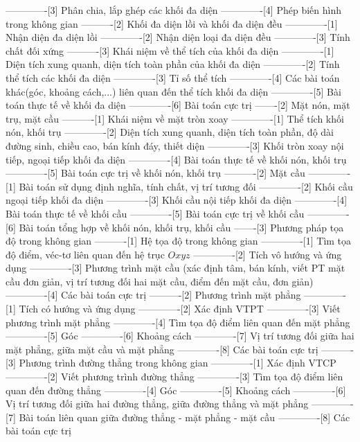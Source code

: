 -------------[3] Phân chia, lắp ghép các khối đa diện
-------------[4] Phép biến hình trong không gian
----------[2] Khối đa diện lồi và khối đa diện đều
-------------[1] Nhận diện đa diện lồi
-------------[2] Nhận diện loại đa diện đều
-------------[3] Tính chất đối xứng
----------[3] Khái niệm về thể tích của khối đa diện
-------------[1] Diện tích xung quanh, diện tích toàn phần của khối đa diện
-------------[2] Tính thể tích các khối đa diện
-------------[3] Tỉ số thể tích
-------------[4] Các bài toán khác(góc, khoảng cách,...) liên quan đến thể tích khối đa diện
-------------[5] Bài toán thực tế về khối đa diện
-------------[6] Bài toán cực trị
-------[2] Mặt nón, mặt trụ, mặt cầu
----------[1] Khái niệm về mặt tròn xoay
-------------[1] Thể tích khối nón, khối trụ
-------------[2] Diện tích xung quanh, diện tích toàn phần, độ dài đường sinh, chiều cao, bán kính đáy, thiết diện
-------------[3] Khối tròn xoay nội tiếp, ngoại tiếp khối đa diện
-------------[4] Bài toán thực tế về khối nón, khối trụ
-------------[5] Bài toán cực trị về khối nón, khối trụ
----------[2] Mặt cầu
-------------[1] Bài toán sử dụng định nghĩa, tính chất, vị trí tương đối
-------------[2] Khối cầu ngoại tiếp khối đa diện
-------------[3] Khối cầu nội tiếp khối đa diện
-------------[4] Bài toán thực tế về khối cầu
-------------[5] Bài toán cực trị về khối cầu
-------------[6] Bài toán tổng hợp về khối nón, khối trụ, khối cầu
-------[3] Phương pháp tọa độ trong không gian
----------[1] Hệ tọa độ trong không gian
-------------[1] Tìm tọa độ điểm, véc-tơ liên quan đến hệ trục $Oxyz$
-------------[2] Tích vô hướng và ứng dụng
-------------[3] Phương trình mặt cầu (xác định tâm, bán kính, viết PT mặt cầu đơn giản, vị trí tương đối hai mặt cầu, điểm đến mặt cầu, đơn giản)
-------------[4] Các bài toán cực trị
----------[2] Phương trình mặt phẳng
-------------[1] Tích có hướng và ứng dụng
-------------[2] Xác định VTPT
-------------[3] Viết phương trình mặt phẳng
-------------[4] Tìm tọa độ điểm liên quan đến mặt phẳng
-------------[5] Góc
-------------[6] Khoảng cách
-------------[7] Vị trí tương đối giữa hai mặt phẳng, giữa mặt cầu và mặt phẳng
-------------[8] Các bài toán cực trị
----------[3] Phương trình đường thẳng trong không gian
-------------[1] Xác định VTCP
-------------[2] Viết phương trình đường thẳng
-------------[3] Tìm tọa độ điểm liên quan đến đường thẳng
-------------[4] Góc
-------------[5] Khoảng cách
-------------[6] Vị trí tương đối giữa hai đường thẳng, giữa đường thẳng và mặt phẳng
-------------[7] Bài toán liên quan giữa đường thẳng - mặt phẳng - mặt cầu
-------------[8] Các bài toán cực trị
